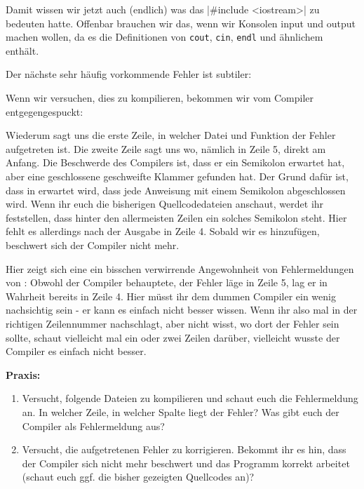 Damit wissen wir jetzt auch (endlich) was das |#include <iostream>|
zu bedeuten hatte. Offenbar brauchen wir das, wenn wir Konsolen input und
output machen wollen, da es die Definitionen von \texttt{cout}, \texttt{cin},
\texttt{endl} und ähnlichem enthält.

Der nächste sehr häufig vorkommende Fehler ist subtiler:


Wenn wir versuchen, dies zu kompilieren, bekommen wir vom Compiler
entgegengespuckt:

\begin{textcode*}{label=g++ -o fehler2 fehler2.cpp}
    fehler2.cpp: In function 'int main()':
    fehler2.cpp:5:1: error: expected ';' before '}' token
\end{textcode*}

Wiederum sagt uns die erste Zeile, in welcher Datei und Funktion der Fehler
aufgetreten ist. Die zweite Zeile sagt uns wo, nämlich in Zeile 5, direkt am
Anfang. Die Beschwerde des Compilers ist, dass er ein Semikolon erwartet hat,
aber eine geschlossene geschweifte Klammer gefunden hat. Der Grund dafür ist,
dass in \Cpp erwartet wird, dass jede Anweisung mit einem Semikolon abgeschlossen
wird.  Wenn ihr euch die bisherigen Quellcodedateien anschaut, werdet ihr
feststellen, dass hinter den allermeisten Zeilen ein solches Semikolon steht.
Hier fehlt es allerdings nach der Ausgabe in Zeile 4. Sobald wir es hinzufügen,
beschwert sich der Compiler nicht mehr.

Hier zeigt sich eine ein bisschen verwirrende Angewohnheit von Fehlermeldungen
von \Cpp: Obwohl der Compiler behauptete, der Fehler läge in Zeile 5, lag er in
Wahrheit bereits in Zeile 4. Hier müsst ihr dem dummen Compiler ein wenig
nachsichtig sein - er kann es einfach nicht besser wissen. Wenn ihr also mal in
der richtigen Zeilennummer nachschlagt, aber nicht wisst, wo dort der Fehler
sein sollte, schaut vielleicht mal ein oder zwei Zeilen darüber, vielleicht
wusste der Compiler es einfach nicht besser.

\textbf{Praxis:}
\begin{enumerate}
    \item Versucht, folgende Dateien zu kompilieren und schaut euch die
        Fehlermeldung an. In welcher Zeile, in welcher Spalte liegt der Fehler?
        Was gibt euch der Compiler als Fehlermeldung aus?
    \item Versucht, die aufgetretenen Fehler zu korrigieren. Bekommt ihr es
        hin, dass der Compiler sich nicht mehr beschwert und das Programm
        korrekt arbeitet (schaut euch ggf. die bisher gezeigten Quellcodes an)?
\end{enumerate}


